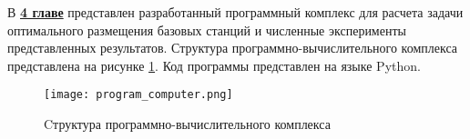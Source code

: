 









В \underline{\textbf{4 главе}} представлен разработанный программный комплекс для расчета задачи оптимального размещения базовых станций и численные эксперименты представленных результатов. Структура программно-вычислительного комплекса представлена на рисунке \ref{fig:synopsis_program_computer}. Код программы представлен на языке Python.

\begin{figure}[h!]
    \centering
     \texttt{[image: program\_computer.png]}
  \caption{Cтруктура программно-вычислительного комплекса}
  \label{fig:synopsis_program_computer}
  \end{figure}

